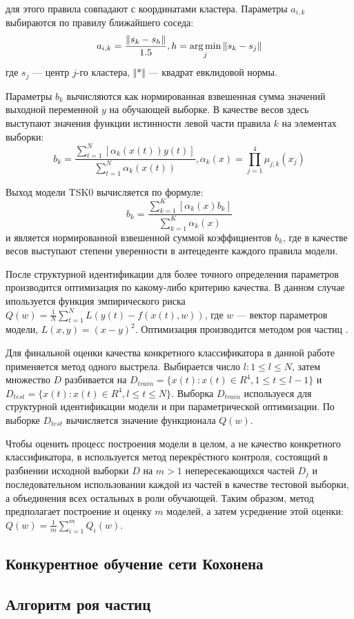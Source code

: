 для этого правила совпадают с координатами кластера. Параметры \(a_{i,k}\) выбираются
по правилу ближайшего соседа:
\begin{displaymath}
a_{i,k}=\frac{\Vert s_k-s_h\Vert}{1.5},h=\operatorname*{arg\,min}_{j}\Vert s_k-s_j\Vert
\end{displaymath}
где \(s_j\) --- центр \(j\)-го кластера, \(\Vert * \Vert\) --- квадрат евклидовой нормы.
\par
Параметры \(b_k\) вычисляются как нормированная взвешенная сумма значений выходной переменной \(y\)
на обучающей выборке. В качестве весов здесь выступают значения функции истинности левой части
правила \(k\) на элементах выборки:
\begin{displaymath}
  b_k=\frac{\sum_{t=1}^{N}[\alpha_k(x(t))y(t)]}{\sum_{t=1}^{N}\alpha_k(x(t))},
  \alpha_k(x)=\prod_{j=1}^{4}\mu_{j,k}(x_j)
\end{displaymath}
\par
Выход модели TSK0 вычисляется по формуле:
\begin{displaymath}
  b_k=\frac{\sum_{k=1}^{K}[\alpha_k(x)b_k]}{\sum_{k=1}^{K}\alpha_k(x)}
\end{displaymath}
и является нормированной взвешенной суммой коэффициентов \(b_k\), где в
качестве весов выступают степени уверенности в антецеденте каждого правила модели.
\par
После структурной идентификации для более точного определения параметров
производится оптимизация по какому-либо критерию качества. В данном
случае ипользуется функция эмпирического риска \(Q(w)=\frac{1}{N}\sum_{t=1}^{N}L(y(t)-f(x(t),w))\),
где \(w\) --- вектор параметров модели, \(L(x,y)=(x-y)^2\). Оптимизация производится
методом роя частиц \cite{pso}.
\par
Для финальной оценки качества конкретного классификатора в данной работе применяется
метод одного выстрела. Выбирается число \(l:1\leqslant l\leqslant N\),
затем множество \(D\) разбивается на \(D_{train} = \{x(t):x(t)\in R^4, 1 \leqslant t \leqslant l-1\}\)
и \(D_{test} = \{x(t):x(t)\in R^4, l \leqslant t \leqslant N\}\). Выборка \(D_{train}\)
используеся для структурной идентификации модели и при параметрической оптимизации.
По выборке \(D_{test}\) вычисляется значение функционала \(Q(w)\).
\par
Чтобы оценить процесс построения модели в целом, а не качество конкретного классификатора,
в используется метод перекрёстного контроля, состоящий в разбиении исходной выборки
\(D\) на \(m>1\) непересекающихся частей \(D_j\) и последовательном использовании
каждой из частей в качестве тестовой выборки, а объединения всех остальных в роли
обучающей. Таким образом, метод предполагает построение и оценку \(m\) моделей, а
затем усреднение этой оценки: \(Q(w)=\frac{1}{m} \sum_{i=1}^{m}Q_i(w)\).

\subsection{Конкурентное обучение сети Кохонена}
\label{subse:kohonen}
\subsection{Алгоритм роя частиц}
\label{subse:pso}
